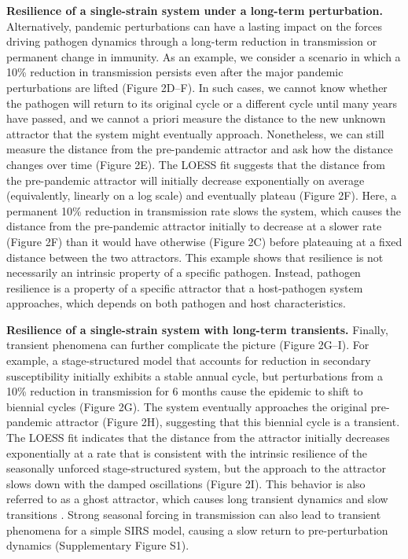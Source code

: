 \documentclass[12pt]{article}
\begin{document}
\textbf{Resilience of a single-strain system under a long-term perturbation.} Alternatively, pandemic perturbations can have a lasting impact on the forces driving pathogen dynamics through a long-term reduction in transmission or permanent change in immunity.
As an example, we consider a scenario in which a 10\% reduction in transmission persists even after the major pandemic perturbations are lifted (Figure 2D--F).
In such cases, we cannot know whether the pathogen will return to its original cycle or a different cycle until many years have passed, and we cannot a priori measure the distance to the new unknown attractor that the system might eventually approach.
Nonetheless, we can still measure the distance from the pre-pandemic attractor and ask how the distance changes over time (Figure 2E).
The LOESS fit suggests that the distance from the pre-pandemic attractor will initially decrease exponentially on average (equivalently, linearly on a log scale) and eventually plateau (Figure 2F).
Here, a permanent 10\% reduction in transmission rate slows the system, which causes the distance from the pre-pandemic attractor initially to decrease at a slower rate (Figure 2F) than it would have otherwise (Figure 2C) before plateauing at a fixed distance between the two attractors.
This example shows that resilience is not necessarily an intrinsic property of a specific pathogen.
Instead, pathogen resilience is a property of a specific attractor that a host-pathogen system approaches, which depends on both pathogen and host characteristics.

\textbf{Resilience of a single-strain system with long-term transients.} Finally, transient phenomena can further complicate the picture (Figure 2G--I).
For example, a stage-structured model that accounts for reduction in secondary susceptibility initially exhibits a stable annual cycle, but perturbations from a 10\% reduction in transmission for 6 months cause the epidemic to shift to biennial cycles (Figure 2G).
The system eventually approaches the original pre-pandemic attractor (Figure 2H), suggesting that this biennial cycle is a transient.
The LOESS fit indicates that the distance from the attractor initially decreases exponentially at a rate that is consistent with the intrinsic resilience of the seasonally unforced stage-structured system, but the approach to the attractor slows down with the damped oscillations (Figure 2I).
This behavior is also referred to as a ghost attractor, which causes long transient dynamics and slow transitions \citep{hastings2018transient}.
Strong seasonal forcing in transmission can also lead to transient phenomena for a simple SIRS model, causing a slow return to pre-perturbation dynamics (Supplementary Figure S1).
\end{document}
